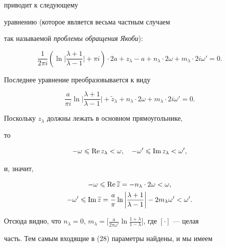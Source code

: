 приводит к следующему


уравнению (которое является весьма частным случаем


так называемой {\it проблемы обращения Якоби}):


$$


\dfrac{1}{2\pi i}\left(\ln\bigg|\dfrac{\lambda+1}


{\lambda-1}\bigg|+\pi i\right)\cdot 2a+z_{\lambda}-a+


n_{\lambda}\cdot 2\omega+m_{\lambda}\cdot 2i\omega'=0.


$$


Последнее уравнение преобразовывается к виду


$$


\dfrac{a}{\pi i}\ln\bigg|\dfrac{\lambda+1}{\lambda-1}\bigg|+


\widetilde{z}_{\lambda}+


n_{\lambda}\cdot 2\omega+m_{\lambda}\cdot 2i\omega'=0.


$$


Поскольку $z_{\lambda}$ должны лежать в основном прямоугольнике,


то


$$


-\omega\leqslant \re z_{\lambda}<\omega,\quad


-\omega'\leqslant \im z_{\lambda}<\omega',


$$


и, значит,


\begin{gather*}


-\omega\leqslant \re \widetilde{z}=-n_{\lambda}\cdot


2\omega<\omega, \\


%


-\omega'\leqslant \im\widetilde{z}=\dfrac{a}{\pi}


\ln\bigg|\dfrac{\lambda+1}{\lambda-1}\bigg|-2m_{\lambda}\omega'<\omega'.


\end{gather*}


Отсюда видно, что $n_{\lambda}=0$, $m_{\lambda}=


\big[\frac{a}{2\pi\omega'}\ln


\frac{1+\lambda}{1-\lambda}\big]$, где $[\cdot]$ --- целая


часть. Тем самым входящие в (28) параметры найдены, и мы имеем


